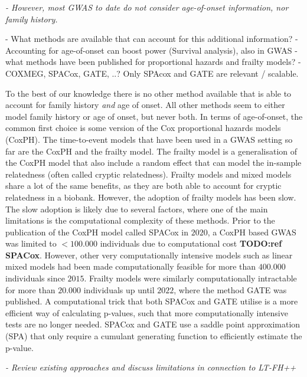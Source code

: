 {\itshape
- However, most GWAS to date do not consider age-of-onset information, nor family history.

	- What methods are available that can account for this additional information?
	- Accounting for age-of-onset can boost power (Survival analysis), also in GWAS 
	- what methods have been published for proportional hazards and frailty models?
	- COXMEG, SPACox, GATE, ..? Only SPAcox and GATE are relevant / scalable.
}

To the best of our knowledge there is no other method available that is able to account for family history \textit{and} age of onset. All other methods seem to either model family history or age of onset, but never both. In terms of age-of-onset, the common first choice is some version of the Cox proportional hazards models (CoxPH). The time-to-event models that have been used in a GWAS setting so far are the CoxPH and the frailty model. The frailty model is a generalisation of the CoxPH model that also include a random effect that can model the in-sample relatedness (often called cryptic relatedness). Frailty models and mixed models share a lot of the same benefits, as they are both able to account for cryptic relatedness in a biobank. However, the adoption of frailty models has been slow. The slow adoption is likely due to several factors, where one of the main limitations is the computational complexity of these methods. Prior to the publication of the CoxPH model called SPACox in $ 2020 $, a CoxPH based GWAS was limited to $ <100.000 $ individuals due to computational cost \textbf{TODO:ref SPACox}. However, other very computationally intensive models such as linear mixed models had been made computationally feasible for more than $ 400.000 $ individuals since $ 2015 $. Frailty models were similarly computationally intractable for more than $ 20.000 $ individuals up until $ 2022 $, where the method GATE was published. A computational trick that both SPACox and GATE utilise is a more efficient way of calculating p-values, such that more computationally intensive tests are no longer needed. SPACox and GATE use a saddle point approximation (SPA) that only require a cumulant generating function to efficiently estimate the p-value.

{\itshape
- Review existing approaches and discuss limitations in connection to LT-FH++
}

